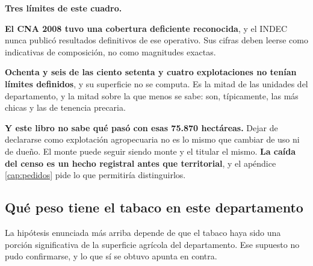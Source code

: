 \begin{cautela}
\textbf{Tres límites de este cuadro.}

\textbf{El CNA 2008 tuvo una cobertura deficiente reconocida}, y el INDEC nunca publicó
resultados definitivos de ese operativo. Sus cifras deben leerse como indicativas de
composición, no como magnitudes exactas.

\textbf{Ochenta y seis de las ciento setenta y cuatro explotaciones no tenían límites
definidos}, y su superficie no se computa. Es la mitad de las unidades del departamento, y la
mitad sobre la que menos se sabe: son, típicamente, las más chicas y las de tenencia precaria.

\textbf{Y este libro no sabe qué pasó con esas 75.870 hectáreas.} Dejar de declararse como
explotación agropecuaria no es lo mismo que cambiar de uso ni de dueño. El monte puede seguir
siendo monte y el titular el mismo. \textbf{La caída del censo es un hecho registral antes que
territorial}, y el apéndice \ref{cap:pedidos} pide lo que permitiría distinguirlos.
\end{cautela}

\subsection*{Qué peso tiene el tabaco en este departamento}

La hipótesis enunciada más arriba depende de que el tabaco haya sido una porción significativa de la superficie agrícola del departamento. Ese supuesto no pudo confirmarse, y lo que sí se obtuvo apunta en contra.

